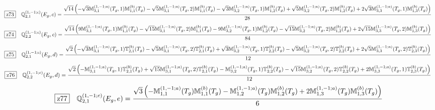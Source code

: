 \documentclass[fleqn,10pt,landscape]{jsarticle}
\begin{document}
\begin{dmath*}
\hspace*{3mm}\fbox{z73}\quad \mathbb{Q}_{2,1}^{(1,-1;c)}(E_{g},c)=\frac{\sqrt{14} \left(- \sqrt{3} \mathbb{M}_{3,1}^{(1,-1;a)}(T_{g},1) \mathbb{M}_{1,1}^{(b)}(T_{g}) - \sqrt{5} \mathbb{M}_{3,1}^{(1,-1;a)}(T_{g},2) \mathbb{M}_{1,1}^{(b)}(T_{g}) - \sqrt{3} \mathbb{M}_{3,2}^{(1,-1;a)}(T_{g},1) \mathbb{M}_{1,2}^{(b)}(T_{g}) + \sqrt{5} \mathbb{M}_{3,2}^{(1,-1;a)}(T_{g},2) \mathbb{M}_{1,2}^{(b)}(T_{g}) + 2 \sqrt{3} \mathbb{M}_{3,3}^{(1,-1;a)}(T_{g},1) \mathbb{M}_{1,3}^{(b)}(T_{g})\right)}{28}
\end{dmath*}
\begin{dmath*}
\hspace*{3mm}\fbox{z74}\quad \mathbb{Q}_{2,2}^{(1,-1;c)}(E_{g},c)=\frac{\sqrt{14} \left(9 \mathbb{M}_{3,1}^{(1,-1;a)}(T_{g},1) \mathbb{M}_{1,1}^{(b)}(T_{g}) - \sqrt{15} \mathbb{M}_{3,1}^{(1,-1;a)}(T_{g},2) \mathbb{M}_{1,1}^{(b)}(T_{g}) - 9 \mathbb{M}_{3,2}^{(1,-1;a)}(T_{g},1) \mathbb{M}_{1,2}^{(b)}(T_{g}) - \sqrt{15} \mathbb{M}_{3,2}^{(1,-1;a)}(T_{g},2) \mathbb{M}_{1,2}^{(b)}(T_{g}) + 2 \sqrt{15} \mathbb{M}_{3,3}^{(1,-1;a)}(T_{g},2) \mathbb{M}_{1,3}^{(b)}(T_{g})\right)}{84}
\end{dmath*}
\begin{dmath*}
\hspace*{3mm}\fbox{z75}\quad \mathbb{Q}_{2,1}^{(1,-1;c)}(E_{g},d)=\frac{\sqrt{2} \left(- \sqrt{3} \mathbb{M}_{3,1}^{(1,-1;a)}(T_{g},1) \mathbb{T}_{2,1}^{(b)}(T_{g}) - \sqrt{5} \mathbb{M}_{3,1}^{(1,-1;a)}(T_{g},2) \mathbb{T}_{2,1}^{(b)}(T_{g}) + \sqrt{3} \mathbb{M}_{3,2}^{(1,-1;a)}(T_{g},1) \mathbb{T}_{2,2}^{(b)}(T_{g}) - \sqrt{5} \mathbb{M}_{3,2}^{(1,-1;a)}(T_{g},2) \mathbb{T}_{2,2}^{(b)}(T_{g}) + 2 \sqrt{5} \mathbb{M}_{3,3}^{(1,-1;a)}(T_{g},2) \mathbb{T}_{2,3}^{(b)}(T_{g})\right)}{12}
\end{dmath*}
\begin{dmath*}
\hspace*{3mm}\fbox{z76}\quad \mathbb{Q}_{2,2}^{(1,-1;c)}(E_{g},d)=\frac{\sqrt{2} \left(- \mathbb{M}_{3,1}^{(1,-1;a)}(T_{g},1) \mathbb{T}_{2,1}^{(b)}(T_{g}) + \sqrt{15} \mathbb{M}_{3,1}^{(1,-1;a)}(T_{g},2) \mathbb{T}_{2,1}^{(b)}(T_{g}) - \mathbb{M}_{3,2}^{(1,-1;a)}(T_{g},1) \mathbb{T}_{2,2}^{(b)}(T_{g}) - \sqrt{15} \mathbb{M}_{3,2}^{(1,-1;a)}(T_{g},2) \mathbb{T}_{2,2}^{(b)}(T_{g}) + 2 \mathbb{M}_{3,3}^{(1,-1;a)}(T_{g},1) \mathbb{T}_{2,3}^{(b)}(T_{g})\right)}{12}
\end{dmath*}
\begin{dmath*}
\hspace*{3mm}\fbox{z77}\quad \mathbb{Q}_{2,1}^{(1,-1;c)}(E_{g},e)=\frac{\sqrt{3} \left(- \mathbb{M}_{1,1}^{(1,-1;a)}(T_{g}) \mathbb{M}_{1,1}^{(b)}(T_{g}) - \mathbb{M}_{1,2}^{(1,-1;a)}(T_{g}) \mathbb{M}_{1,2}^{(b)}(T_{g}) + 2 \mathbb{M}_{1,3}^{(1,-1;a)}(T_{g}) \mathbb{M}_{1,3}^{(b)}(T_{g})\right)}{6}
\end{dmath*}
\end{document}
